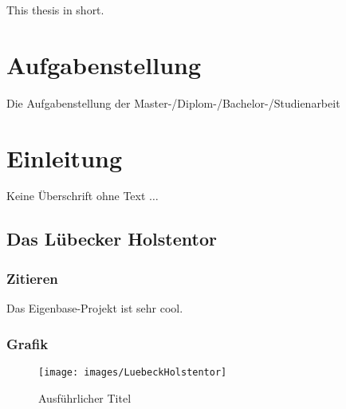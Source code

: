 \documentclass[
	ngerman,
	11pt,
	twoside,
	a4paper,
	headsepline,
	footsepline, 
	toc=bib
]{scrbook}
\begin{document}
This thesis in short.

\thispagestyle{empty}
\cleardoublepage


\chapter*{Aufgabenstellung}

Die Aufgabenstellung der Master-/Diplom-/Bachelor-/Studienarbeit


	\thispagestyle{empty}
	\cleardoublepage

	\mainmatter


\chapter{Einleitung}
\label{cha:einleitung}

Keine Überschrift ohne Text $\dots$

\section{Das Lübecker Holstentor}
\label{sec:holstentor}

\subsection{Zitieren}
\label{sec:cite}

Das Eigenbase-Projekt \cite{Akyildiz2008a} ist sehr cool.

\subsection{Grafik}

\begin{figure}[htbp]
	\begin{center}
		\texttt{[image: images/LuebeckHolstentor]}
		\caption[Kurzfassung für Abbildungsverzeichnis]{Ausführlicher Titel}
		\label{fig:Holstentor}
		\end{center}
\end{figure}
\end{document}

